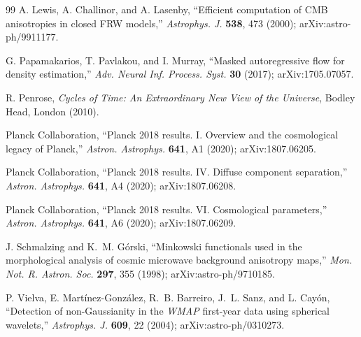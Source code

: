 \documentclass[11pt,a4paper]{article}
\begin{document}
\begin{thebibliography}{99}
A. Lewis, A. Challinor, and A. Lasenby,
``Efficient computation of CMB anisotropies in closed FRW models,''
\emph{Astrophys. J.} \textbf{538}, 473 (2000); arXiv:astro-ph/9911177.

G. Papamakarios, T. Pavlakou, and I. Murray,
``Masked autoregressive flow for density estimation,''
\emph{Adv. Neural Inf. Process. Syst.} \textbf{30} (2017); arXiv:1705.07057.

R. Penrose,
\emph{Cycles of Time: An Extraordinary New View of the Universe},
Bodley Head, London (2010).

Planck Collaboration,
``Planck 2018 results. I. Overview and the cosmological legacy of Planck,''
\emph{Astron. Astrophys.} \textbf{641}, A1 (2020); arXiv:1807.06205.

Planck Collaboration,
``Planck 2018 results. IV. Diffuse component separation,''
\emph{Astron. Astrophys.} \textbf{641}, A4 (2020); arXiv:1807.06208.

Planck Collaboration,
``Planck 2018 results. VI. Cosmological parameters,''
\emph{Astron. Astrophys.} \textbf{641}, A6 (2020); arXiv:1807.06209.

J. Schmalzing and K.~M. G\'orski,
``Minkowski functionals used in the morphological analysis of cosmic microwave background anisotropy maps,''
\emph{Mon. Not. R. Astron. Soc.} \textbf{297}, 355 (1998); arXiv:astro-ph/9710185.

P. Vielva, E. Mart\'inez-Gonz\'alez, R.~B. Barreiro, J.~L. Sanz, and L. Cay\'on,
``Detection of non-Gaussianity in the \emph{WMAP} first-year data using spherical wavelets,''
\emph{Astrophys. J.} \textbf{609}, 22 (2004); arXiv:astro-ph/0310273.

\end{thebibliography}
\end{document}
